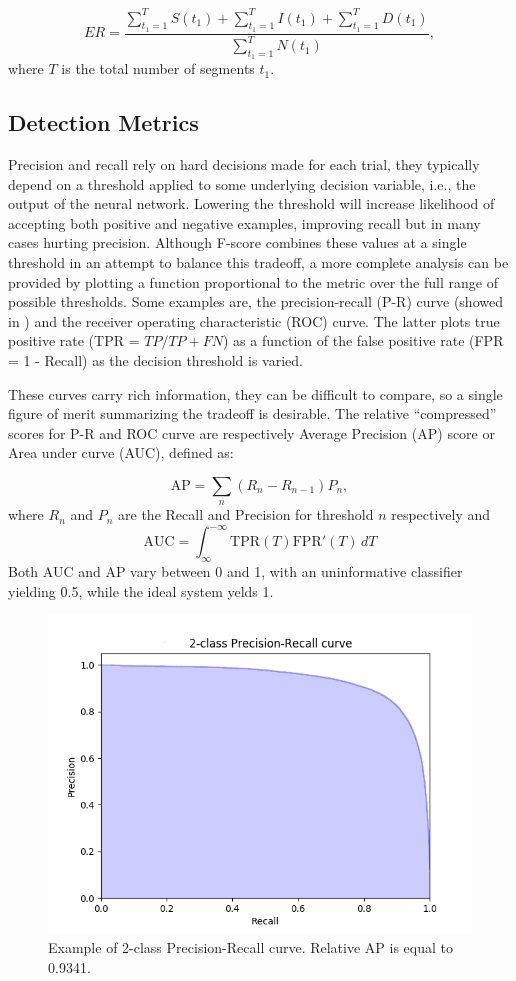 \begin{equation}
ER = \frac{\sum_{t_1=1}^{T} S(t_1) + \sum_{t_1=1}^{T} I(t_1) + \sum_{t_1=1}^{T} D(t_1)}{\sum_{t_1=1}^{T} N(t_1)},
\end{equation}
where $T$ is the total number of segments $t_1$.


\subsection{Detection Metrics}
Precision and recall rely on hard decisions made for each trial, they typically depend on a threshold applied to some underlying decision variable, i.e., the output of the neural network. 
Lowering the threshold will increase likelihood of accepting both positive and negative examples, improving recall but in many cases hurting precision. Although F-score combines these values at a single threshold in an attempt to balance this
tradeoff, a more complete analysis can be provided by plotting a function proportional to the metric over the full range of possible thresholds. Some examples are, the precision-recall (P-R) curve (showed in ) and the receiver operating characteristic (ROC) curve. The latter plots true positive rate (TPR = $TP/TP+FN$) as a function of the false
positive rate (FPR = 1 - Recall) as the decision threshold is
varied. 

These curves carry rich information, they can be difficult to compare, so a
 single figure of merit summarizing the tradeoff is desirable. The
relative ``compressed'' scores for P-R and ROC curve are respectively Average Precision (AP) score
or Area under curve (AUC), defined as:

\begin{equation}
\text{AP} = \sum_n (R_n-R_{n-1})P_n,
\end{equation}
where $R_n$ and $P_n$ are the Recall and Precision for threshold $n$ respectively and
\begin{equation}
\text{AUC}=\int _{\infty }^{-\infty }{\mbox{TPR}}(T){\mbox{FPR}}'(T)\,dT
\end{equation}
Both AUC and AP vary between 0 and 1, with an uninformative classifier yielding 0.5, while the ideal system yelds 1.


\begin{figure}[h]
	\centering
	\includegraphics[width=0.5\linewidth]{img/precision_recall_curve.png}
	\caption[P-R Curve]{Example of 2-class Precision-Recall curve. Relative AP is equal to 0.9341.}	
	\label{fig:roc}
\end{figure}

